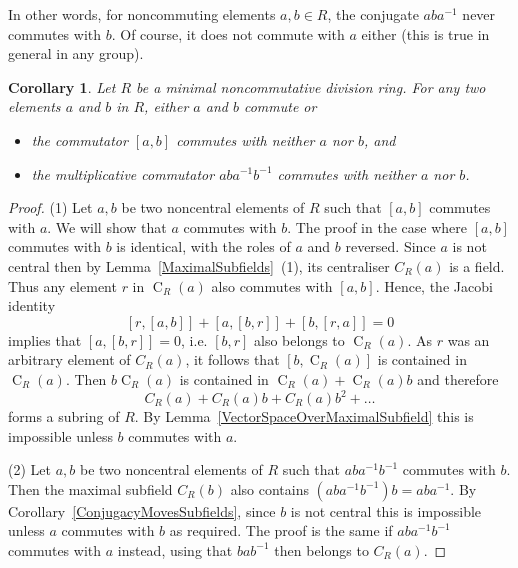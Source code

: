 \documentclass[11pt]{article}
\DeclareMathOperator{\C}{C}
\newtheorem{corollary}{Corollary}[section]
\theoremstyle{definition}
\begin{document}
In other words, for noncommuting elements $a,b\in R$, the conjugate $aba^{-1}$ never commutes with $b$. Of course, it does not commute with $a$ either (this is true in general in any group).

\begin{corollary}
Let $R$ be a minimal noncommutative division ring. For any two elements $a$ and $b$ in $R$, either $a$ and $b$ commute or
\begin{itemize}[topsep=0pt]
\item[(1)] the commutator $[a,b]$ commutes with neither $a$ nor $b$, and
\item[(2)] the multiplicative commutator $aba^{-1}b^{-1}$ commutes with neither $a$ nor $b$.
\end{itemize}
\end{corollary}

\begin{proof}
(1) Let $a,b$ be two noncentral elements of $R$ such that $[a,b]$ commutes with $a$. We will show that $a$ commutes with $b$. The proof in the case where $[a,b]$ commutes with $b$ is identical, with the roles of $a$ and $b$ reversed. Since $a$ is not central then by Lemma~\ref{MaximalSubfields}~(1), its centraliser $C_R(a)$ is a field. Thus any element $r$ in $\C_R(a)$ also commutes with $[a,b]$. Hence, the Jacobi identity
\[[r,[a,b]]+[a,[b,r]]+[b,[r,a]]=0\]
implies that $[a,[b,r]]=0$, i.e. $[b,r]$ also belongs to $\C_R(a)$. As $r$ was an arbitrary element of $C_R(a)$, it follows that $[b,\C_R(a)]$ is contained in $\C_R(a)$. Then $b\C_R(a)$ is contained in $\C_R(a)+ \C_R(a)b$ and therefore
\[C_R(a)+C_R(a)b+C_R(a)b^2+\ldots\]
forms a subring of $R$. By Lemma~\ref{VectorSpaceOverMaximalSubfield} this is impossible unless $b$ commutes with $a$.

(2) Let $a,b$ be two noncentral elements of $R$ such that $aba^{-1}b^{-1}$ commutes with $b$. Then the maximal subfield $C_R(b)$ also contains $(aba^{-1}b^{-1})b=aba^{-1}$. By Corollary~\ref{ConjugacyMovesSubfields}, since $b$ is not central this is impossible unless $a$ commutes with $b$ as required. The proof is the same if $aba^{-1}b^{-1}$ commutes with $a$ instead, using that $bab^{-1}$ then belongs to $C_R(a)$.
\end{proof}
\end{document}
